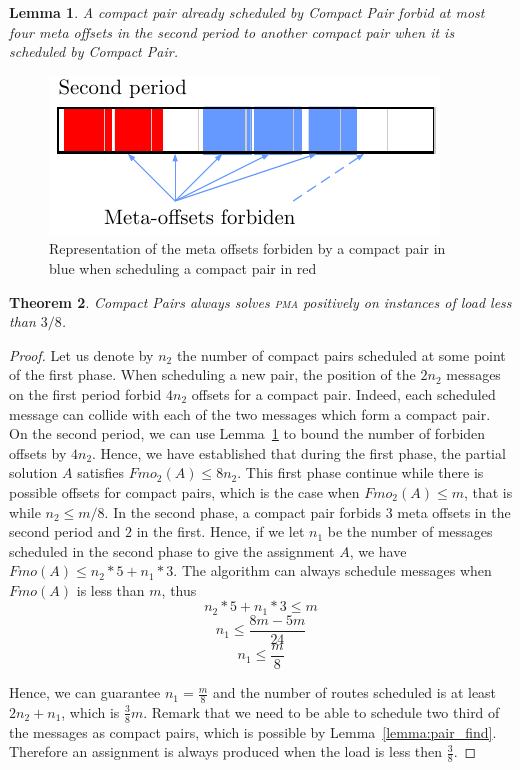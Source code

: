 \documentclass[10pt, conference, letterpaper]{IEEEtran}
\newtheorem{theorem}{Theorem}
\newtheorem{lemma}[theorem]{Lemma}
\newcommand\pma{\textsc{pma}\xspace}
\begin{document}
\begin{lemma}\label{lemma:pair_forbid}
A compact pair already scheduled by Compact Pair forbid at most four meta offsets in the second period to another compact pair when it is scheduled by Compact Pair.
\end{lemma}

\begin{figure}
\begin{center}
\includegraphics[scale=0.7]{forbiden}
\end{center}
\label{fig:forbidenmeta}
\caption{Representation of the meta offsets forbiden by a compact pair in blue when scheduling a compact pair in red} 
\end{figure}
\begin{theorem}
Compact Pairs always solves \pma positively on instances of load less than
$3/8$.
\end{theorem}
\begin{proof}
Let us denote by $n_2$ the number of compact pairs scheduled at some point of 
the first phase. When scheduling a new pair, the position of the $2n_2$ messages on the first
period forbid $4n_2$ offsets for a compact pair. Indeed, each scheduled message can collide
with each of the two messages which form a compact pair. On the second period, we can use Lemma~\ref{lemma:pair_forbid} to bound the number of forbiden offsets by $4n_2$. 
Hence, we have established that during the first phase, the partial solution $A$
satisfies $Fmo_2(A) \leq 8n_2$. This first phase continue while there is possible offsets for compact pairs, which is the case when $Fmo_2(A) \leq m$, that is while $n_2 \leq m/8$.
In the second phase, a compact pair forbids $3$ meta offsets in the 
second period and $2$ in the first. Hence, if we let $n_1$ be the number of messages scheduled in the second phase to give the assignment $A$, we have $Fmo(A) \leq n_2*5 + n_1*3$. 
The algorithm can always schedule messages when $Fmo(A)$ is less than $m$, thus
$$ n_2*5 + n_1*3 \leq m$$
$$ n_1 \leq \frac{8m - 5m }{24}$$
$$n_1 \leq \frac{m}{8}$$

Hence, we can guarantee $n_1 = \frac{m}{8}$ and the number of routes scheduled is at least $2n_2 + n_1$,
which is $\frac{3}{8}m$. Remark that we need to be able to schedule two third of the messages as compact pairs, which is possible by Lemma~\ref{lemma:pair_find}. Therefore an assignment is always produced when the load is less then $\frac{3}{8}$.
\end{proof}
\end{document}
